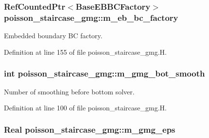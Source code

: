 \subsubsection[{\texorpdfstring{m\+\_\+eb\+\_\+bc\+\_\+factory}{m_eb_bc_factory}}]{\setlength{\rightskip}{0pt plus 5cm}Ref\+Counted\+Ptr$<$Base\+E\+B\+B\+C\+Factory$>$ poisson\+\_\+staircase\+\_\+gmg\+::m\+\_\+eb\+\_\+bc\+\_\+factory\hspace{0.3cm}{\ttfamily [protected]}}\hypertarget{classpoisson__staircase__gmg_a842d2c9d88838b82c44d6bda6cce4e98}{}\label{classpoisson__staircase__gmg_a842d2c9d88838b82c44d6bda6cce4e98}


Embedded boundary BC factory. 



Definition at line 155 of file poisson\+\_\+staircase\+\_\+gmg.\+H.

\subsubsection[{\texorpdfstring{m\+\_\+gmg\+\_\+bot\+\_\+smooth}{m_gmg_bot_smooth}}]{\setlength{\rightskip}{0pt plus 5cm}int poisson\+\_\+staircase\+\_\+gmg\+::m\+\_\+gmg\+\_\+bot\+\_\+smooth\hspace{0.3cm}{\ttfamily [protected]}}\hypertarget{classpoisson__staircase__gmg_ab2e0db3c965eed182c0ad088786a7100}{}\label{classpoisson__staircase__gmg_ab2e0db3c965eed182c0ad088786a7100}


Number of smoothing before bottom solver. 



Definition at line 100 of file poisson\+\_\+staircase\+\_\+gmg.\+H.

\subsubsection[{\texorpdfstring{m\+\_\+gmg\+\_\+eps}{m_gmg_eps}}]{\setlength{\rightskip}{0pt plus 5cm}Real poisson\+\_\+staircase\+\_\+gmg\+::m\+\_\+gmg\+\_\+eps\hspace{0.3cm}{\ttfamily [protected]}}\hypertarget{classpoisson__staircase__gmg_a59be10814772bb99a719f46267d25f67}{}\label{classpoisson__staircase__gmg_a59be10814772bb99a719f46267d25f67}



